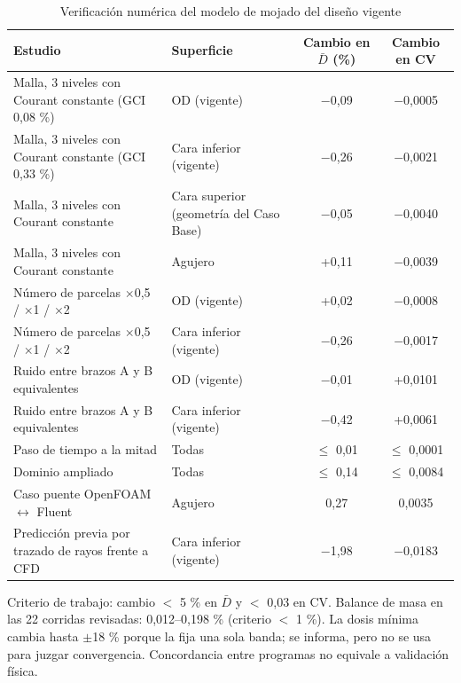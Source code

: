 \begin{table}[htbp]
\centering\small\singlespacing
\setlength{\tabcolsep}{3.5pt}
\caption{Verificación numérica del modelo de mojado del diseño vigente}
\label{tab:cfd-verificacion-vigente}
\begin{tabularx}{\textwidth}{@{}Ylcc@{}}
\toprule
\textbf{Estudio} & \textbf{Superficie} & \textbf{Cambio en $\bar D$ (\%)} & \textbf{Cambio en CV}\\
\midrule
Malla, 3 niveles con Courant constante (GCI 0,08 \%) & OD (vigente) & $-$0,09 & $-$0,0005\\
Malla, 3 niveles con Courant constante (GCI 0,33 \%) & Cara inferior (vigente) & $-$0,26 & $-$0,0021\\
Malla, 3 niveles con Courant constante & Cara superior (geometría del Caso Base) & $-$0,05 & $-$0,0040\\
Malla, 3 niveles con Courant constante & Agujero & +0,11 & $-$0,0039\\
Número de parcelas $\times$0,5 / $\times$1 / $\times$2 & OD (vigente) & +0,02 & $-$0,0008\\
Número de parcelas $\times$0,5 / $\times$1 / $\times$2 & Cara inferior (vigente) & $-$0,26 & $-$0,0017\\
Ruido entre brazos A y B equivalentes & OD (vigente) & $-$0,01 & +0,0101\\
Ruido entre brazos A y B equivalentes & Cara inferior (vigente) & $-$0,42 & +0,0061\\
Paso de tiempo a la mitad & Todas & $\leq$ 0,01 & $\leq$ 0,0001\\
Dominio ampliado & Todas & $\leq$ 0,14 & $\leq$ 0,0084\\
Caso puente OpenFOAM $\leftrightarrow$ Fluent & Agujero & 0,27 & 0,0035\\
Predicción previa por trazado de rayos frente a CFD & Cara inferior (vigente) & $-$1,98 & $-$0,0183\\
\bottomrule
\end{tabularx}
\par\smallskip\footnotesize
Criterio de trabajo: cambio $<$ 5 \% en $\bar D$ y $<$ 0,03 en CV. Balance de masa en las 22 corridas revisadas: 0,012–0,198 \% (criterio $<$ 1 \%). La dosis mínima cambia hasta $\pm$18 \% porque la fija una sola banda; se informa, pero no se usa para juzgar convergencia. Concordancia entre programas no equivale a validación física.
\end{table}

